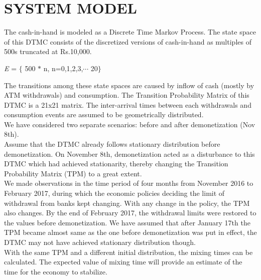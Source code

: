 \documentclass[12pt]{article}
\begin{document}
\section{SYSTEM MODEL}
The cash-in-hand is modeled as a Discrete Time Markov Process. The state space of this DTMC consists of the discretized versions of cash-in-hand as multiples of 500s truncated at Rs.10,000.
\begin{center}
\textit{E} = $\lbrace$ 500 $*$ n, n=0,1,2,3,$\cdots$ 20$\rbrace$
\end{center}
The transitions among these state spaces are caused by inflow of cash (mostly by ATM withdrawals) and consumption. The Transition Probability Matrix of this DTMC is a 21x21 matrix. The inter-arrival times between each withdrawals and consumption events are assumed to be geometrically distributed.\\
We have considered two separate scenarios: before and after demonetization (Nov 8th). \\
Assume that the DTMC already follows stationary distribution before demonetization. 
On November 8th, demonetization acted as a disturbance to this DTMC which had achieved stationarity, thereby changing the Transition Probability Matrix (TPM) to a great extent. \\We made observations in the time period of four months from November 2016 to February 2017, during which the economic policies deciding the limit of withdrawal from banks kept changing. With any change in the policy, the TPM also changes. By the end of February 2017, the withdrawal limits were restored to the values before demonetization.  We have assumed that after January 17th the TPM became almost same as the one before demonetization was put in effect, the DTMC may not have achieved stationary distribution though.\\ With the same TPM and a different initial distribution, the mixing times can be calculated. The expected value of mixing time will provide an estimate of the time for the economy to stabilize.
\end{document}
